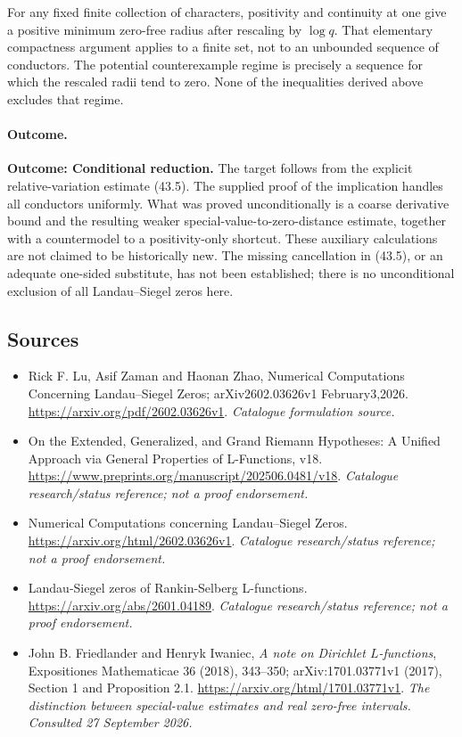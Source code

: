 \documentclass[11pt,a4paper]{article}
\numberwithin{equation}{section}
\begin{document}
For any fixed finite collection of characters, positivity and continuity
at one give a positive minimum zero-free radius after rescaling by
$\log q$. That elementary compactness argument applies to a finite set,
not to an unbounded sequence of conductors. The potential counterexample
regime is precisely a sequence for which the rescaled radii tend to zero.
None of the inequalities derived above excludes that regime.

\paragraph{Outcome.}
\textbf{Outcome: Conditional reduction.}
The target follows from the explicit relative-variation estimate (43.5).
The supplied proof of the implication handles all conductors uniformly.
What was proved unconditionally is a coarse derivative bound and the
resulting weaker special-value-to-zero-distance estimate, together with a
countermodel to a positivity-only shortcut. These auxiliary calculations
are not claimed to be historically new. The missing cancellation in
(43.5), or an adequate one-sided substitute, has not been established;
there is no unconditional exclusion of all Landau--Siegel zeros here.
\subsection{Sources}
\begin{itemize}\raggedright
\item[\textnormal{[S1]}]\hypertarget{source:1509:1}{} Rick F. Lu, Asif Zaman and Haonan Zhao, Numerical Computations Concerning Landau–Siegel Zeros; arXiv2602.03626v1 February3,2026.
\url{https://arxiv.org/pdf/2602.03626v1}.
{\small\textit{Catalogue formulation source.}}
\item[\textnormal{[S2]}]\hypertarget{source:1509:2}{} On the Extended, Generalized, and Grand Riemann Hypotheses: A Unified Approach via General Properties of L-Functions, v18.
\url{https://www.preprints.org/manuscript/202506.0481/v18}.
{\small\textit{Catalogue research/status reference; not a proof endorsement.}}
\item[\textnormal{[S3]}]\hypertarget{source:1509:3}{} Numerical Computations concerning Landau–Siegel Zeros.
\url{https://arxiv.org/html/2602.03626v1}.
{\small\textit{Catalogue research/status reference; not a proof endorsement.}}
\item[\textnormal{[S4]}]\hypertarget{source:1509:4}{} Landau-Siegel zeros of Rankin-Selberg L-functions.
\url{https://arxiv.org/abs/2601.04189}.
{\small\textit{Catalogue research/status reference; not a proof endorsement.}}
\item[\textnormal{[E1]}]\hypertarget{extra:1509:1}{} John B. Friedlander and Henryk Iwaniec,
\emph{A note on Dirichlet $L$-functions}, Expositiones Mathematicae 36 (2018),
343--350; arXiv:1701.03771v1 (2017), Section 1 and Proposition 2.1.
\url{https://arxiv.org/html/1701.03771v1}.
{\small\textit{The distinction between special-value estimates and real zero-free intervals. Consulted 27 September 2026.}}
\end{itemize}
\end{document}
